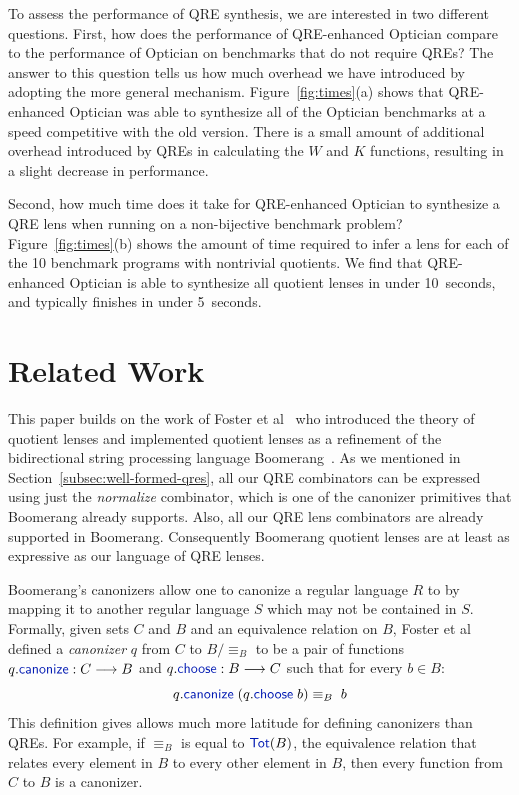 \documentclass[acmsmall,screen]{acmart}
\newcommand{\kw}[1]{\textcolor{dkblue}{\ensuremath{\mathsf{#1}}}}
\newcommand{\QOpt}{QRE-enhanced Optician}
\begin{document}
To assess the performance of QRE synthesis, we are interested in two different
questions. First, how does the performance of \QOpt{} compare to the performance
of Optician on benchmarks that do not require QREs? The answer to this question
tells us how much overhead we have introduced by adopting the more general
mechanism. Figure~\ref{fig:times}(a) shows that \QOpt{} was able to synthesize
all of the Optician benchmarks at a speed competitive with the old version.
There is a small amount of additional overhead introduced by QREs in calculating
the $W$ and $K$ functions, resulting in a slight decrease in performance.

Second, how much time does it take for \QOpt{} to synthesize a QRE
lens when running on a non-bijective benchmark problem?  
Figure~\ref{fig:times}(b) shows the amount of time required to infer a
lens for each of the 10 benchmark programs with nontrivial quotients.  
We find that \QOpt{} is able to synthesize all quotient lenses in
under 10~seconds, and typically finishes in under 5~seconds.

\section{Related Work}
\label{relwork}
This paper builds on the work of Foster et al~\cite{quotientlenses} who
introduced the theory of quotient lenses and implemented quotient lenses as a
refinement of the bidirectional string processing language
Boomerang~\cite{boomerang}. As we mentioned in
Section~\ref{subsec:well-formed-qres}, all our QRE combinators can be expressed
using just the {\em normalize} combinator, which is one of the canonizer
primitives that Boomerang already supports. Also, all our QRE lens combinators
are already supported in Boomerang. Consequently Boomerang quotient lenses are
at least as expressive as our language of QRE lenses. 

Boomerang's canonizers allow one to canonize a regular language $R$ to by
mapping it to another regular language $S$ which may not be contained in $S$.
Formally, given sets $C$ and $B$ and an equivalence relation on $B$, Foster et
al defined a {\em canonizer} $q$ from $C$ to $B/{\equiv_B}$ to be a pair of
functions $q.\kw{canonize} : C \longrightarrow B$ and $q.\kw{choose} : B
\longrightarrow C$ such that for every $b \in B$:
$$q.\kw{canonize} \; (q.\kw{choose} \; b) \equiv_B \; b$$
This definition gives allows much more latitude for defining canonizers than
QREs. For example, if $\equiv_B$ is equal to $\kw{Tot}(B)$, the equivalence
relation that relates every element in $B$ to every other element in $B$, then
every function from $C$ to $B$ is a canonizer.
\end{document}
